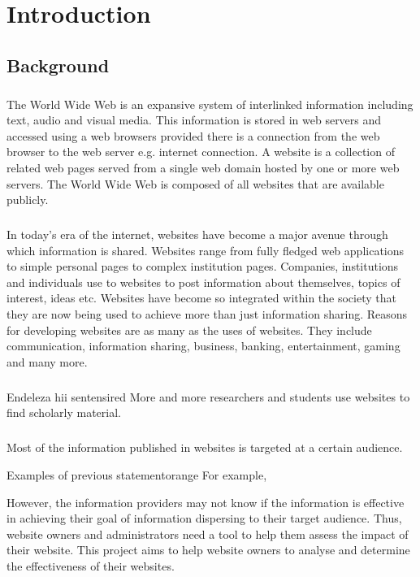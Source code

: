 \chapter{Introduction}
\section{Background}
\paragraph{}
The World Wide Web is an expansive system of interlinked information including text, audio and visual media. This information is stored in web servers and accessed using a web browsers provided there is a connection from the web browser to the web server e.g. internet connection. A website is a collection of related web pages served from a single web domain hosted by one or more web servers. The World Wide Web is composed of all websites that are available publicly.
\paragraph{}
In today's era of the internet, websites have become a major avenue through which information is shared. Websites range from fully fledged web applications to simple personal pages to complex institution pages. Companies, institutions and individuals use to websites to post information about themselves, topics of interest, ideas etc. Websites have become so integrated within the society that they are now being used to achieve more than just information sharing. Reasons for developing websites are as many as the uses of websites. They include communication, information sharing, business, banking, entertainment, gaming and many more.
\paragraph{}
\begin{review_comment}{Endeleza hii sentensi}{red}
{More and more researchers and students use websites to find scholarly material.
}\end{review_comment}
\paragraph{}
Most of the information published in websites is targeted at a certain audience. \begin{review_comment}{Examples of previous statement}{orange}
{For example,}\end{review_comment}
However, the information providers may not know if the information is effective in achieving their goal of information dispersing to their target audience. Thus, website owners and administrators need a tool to help them assess the impact of their website. This project aims to help website owners to analyse and determine the effectiveness of their websites.


